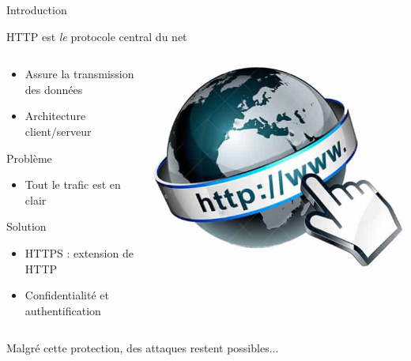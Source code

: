 \begin{frame}{Introduction}

  {\Large \centerline{HTTP est \emph{le} protocole central du net}}
  \hspace{40cm}

  \begin{columns}
    \begin{column}{0.5\textwidth}
      \begin{itemize}
      \item{Assure la transmission des données}
      \item{Architecture client/serveur}
      \end{itemize}
      \begin{alertblock}{Problème}
        \begin{itemize}
        \item{Tout le trafic est en clair}
        \end{itemize}
      \end{alertblock}

      \begin{exampleblock}{Solution}
        \begin{itemize}
        \item{HTTPS : extension de HTTP}
        \item{Confidentialité et authentification}
        \end{itemize}
      \end{exampleblock}
    \end{column}
    \begin{column}{0.5\textwidth}
      \includegraphics[width=\linewidth]{../medias/www.png}
    \end{column}
  \end{columns}

  \hspace{20cm}

  {\Large \centerline{Malgré cette protection, des attaques restent possibles...}}


\end{frame}

